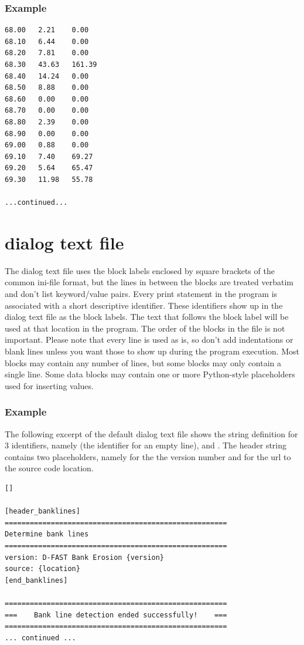 \subsubsection*{Example}

\begin{Verbatim}
68.00   2.21    0.00
68.10   6.44    0.00
68.20   7.81    0.00
68.30   43.63   161.39
68.40   14.24   0.00
68.50   8.88    0.00
68.60   0.00    0.00
68.70   0.00    0.00
68.80   2.39    0.00
68.90   0.00    0.00
69.00   0.88    0.00
69.10   7.40    69.27
69.20   5.64    65.47
69.30   11.98   55.78

...continued...
\end{Verbatim}

\section{dialog text file}

The dialog text file uses the block labels enclosed by square brackets of the common ini-file format, but the lines in between the blocks are treated verbatim and don't list keyword/value pairs.
Every print statement in the program is associated with a short descriptive identifier.
These identifiers show up in the dialog text file as the block labels.
The text that follows the block label will be used at that location in the program.
The order of the blocks in the file is not important.
Please note that every line is used as is, so don't add indentations or blank lines unless you want those to show up during the program execution.
Most blocks may contain any number of lines, but some blocks may only contain a single line.
Some data blocks may contain one or more Python-style placeholders used for inserting values.

\subsubsection*{Example}

The following excerpt of the default  dialog text file shows the string definition
for 3 identifiers, namely  (the identifier for an empty line),  and
.
The header string contains two placeholders, namely  for the the version number and  for the url to the source code location.

\begin{Verbatim}
[]

[header_banklines]
=====================================================
Determine bank lines
=====================================================
version: D-FAST Bank Erosion {version}
source: {location}
[end_banklines]

=====================================================
===    Bank line detection ended successfully!    ===
=====================================================
... continued ...
\end{Verbatim}